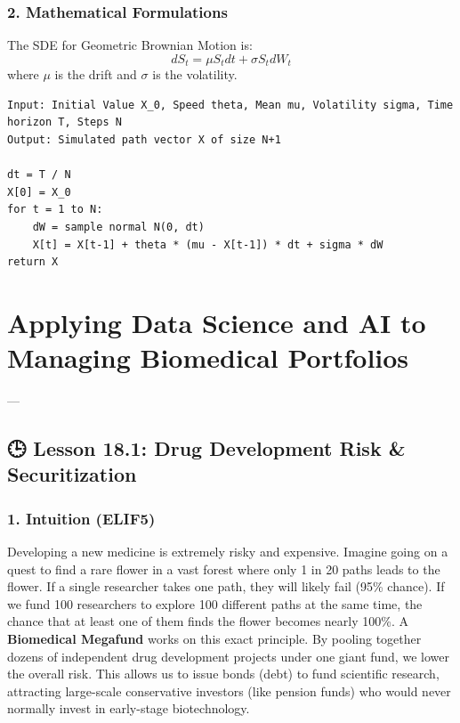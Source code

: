 \documentclass[11pt,oneside]{book}
\begin{document}
\subsection{2. Mathematical Formulations}
The SDE for Geometric Brownian Motion is:
$$dS_t = \mu S_t dt + \sigma S_t dW_t$$
where $\mu$ is the drift and $\sigma$ is the volatility.

\begin{tcolorbox}[colback=white,colframe=black,boxrule=0.6pt,arc=0mm,title=Euler-Maruyama OU Process]
\begin{verbatim}
Input: Initial Value X_0, Speed theta, Mean mu, Volatility sigma, Time horizon T, Steps N
Output: Simulated path vector X of size N+1

dt = T / N
X[0] = X_0
for t = 1 to N:
    dW = sample normal N(0, dt)
    X[t] = X[t-1] + theta * (mu - X[t-1]) * dt + sigma * dW
return X
\end{verbatim}
\end{tcolorbox}


\newpage

\chapter{Applying Data Science and AI to Managing Biomedical Portfolios}

---

\section{🕒 Lesson 18.1: Drug Development Risk \& Securitization}

\subsection{1. Intuition (ELIF5)}
Developing a new medicine is extremely risky and expensive. Imagine going on a quest to find a rare flower in a vast forest where only 1 in 20 paths leads to the flower. If a single researcher takes one path, they will likely fail (95\% chance). If we fund 100 researchers to explore 100 different paths at the same time, the chance that at least one of them finds the flower becomes nearly 100\%. 
A \textbf{Biomedical Megafund} works on this exact principle. By pooling together dozens of independent drug development projects under one giant fund, we lower the overall risk. This allows us to issue bonds (debt) to fund scientific research, attracting large-scale conservative investors (like pension funds) who would never normally invest in early-stage biotechnology.
\end{document}
